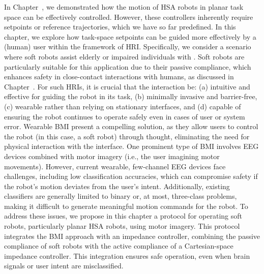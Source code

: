 \begin{foreword}
    In Chapter~\circled{\ref{chp:hsacontrol}}, we demonstrated how the motion of \gls{HSA} robots in planar task space can be effectively controlled. However, these controllers inherently require setpoints or reference trajectories, which we have so far predefined. In this chapter, we explore how task-space setpoints can be guided more effectively by a (human) user within the framework of \gls{HRI}. Specifically, we consider a scenario where soft robots assist elderly or impaired individuals with . Soft robots are particularly suitable for this application due to their passive compliance, which enhances safety in close-contact interactions with humans, as discussed in Chapter~\circled{\ref{chp:safetymetric}}.
    For such \glspl{HRI}, it is crucial that the interaction be: (a) intuitive and effective for guiding the robot in its task, (b) minimally invasive and barrier-free, (c) wearable rather than relying on stationary interfaces, and (d) capable of ensuring the robot continues to operate safely even in cases of user or system error. Wearable \gls{BMI} present a compelling solution, as they allow users to control the robot (in this case, a soft robot) through thought, eliminating the need for physical interaction with the interface. One prominent type of \gls{BMI} involves \gls{EEG} devices combined with motor imagery (i.e., the user imagining motor movements).
    However, current wearable, few-channel \gls{EEG} devices face challenges, including low classification accuracies, which can compromise safety if the robot’s motion deviates from the user’s intent. Additionally, existing classifiers are generally limited to binary or, at most, three-class problems, making it difficult to generate meaningful motion commands for the robot.
    To address these issues, we propose in this chapter a protocol for operating soft robots, particularly planar \gls{HSA} robots, using motor imagery. This protocol integrates the \gls{BMI} approach with an impedance controller, combining the passive compliance of soft robots with the active compliance of a Cartesian-space impedance controller. This integration ensures safe operation, even when brain signals or user intent are misclassified.
\end{foreword}

\pagebreak

